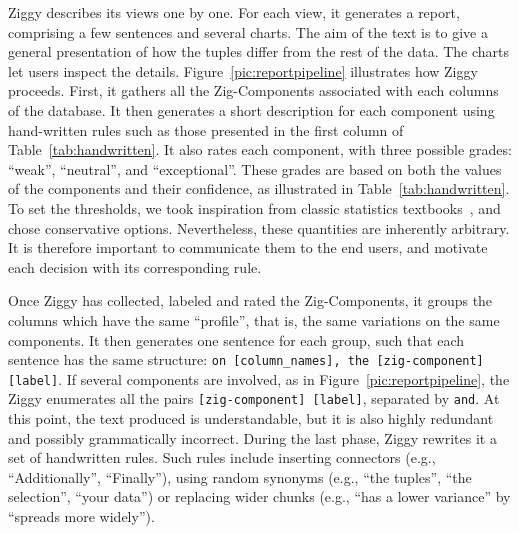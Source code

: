 Ziggy describes its views one by one. For each view, it generates a report,
comprising a few sentences and several charts. The aim of the text is to give a
general presentation of how the tuples differ from the rest of the data. The
charts let users inspect the details.  Figure~\ref{pic:reportpipeline}
illustrates how Ziggy proceeds. First, it gathers all the Zig-Components
associated with each columns of the database. It then ge\-nerates a short
description for each component using hand-written rules such as those
presented in the first column of Table~\ref{tab:handwritten}. It also rates 
each component, with three possible grades: ``weak'', ``neutral'', and
``exceptional''. These grades are based on both the values of the components
and their confidence, as illustrated in Table~\ref{tab:handwritten}.  To set
the thresholds, we took inspiration from classic statistics
textbooks~\cite{cohen1977statistical}, and chose conservative options.
Nevertheless, these quantities are inherently arbitrary. It is therefore
important to communicate them to the end users, and motivate each decision with
its corresponding rule.

Once Ziggy has collected, labeled and rated the Zig-Comp\-onents, it  groups
the columns which have the same ``profile'', that is, the same variations on
the same components. It then generates one sentence for each group, such that
each sentence has the same structure: \texttt{on [column\_names], the
[zig-component] [label]}. If several components are involved, as in
Figure~\ref{pic:reportpipeline}, the Ziggy enumerates all the pairs
\texttt{[zig-component] [label]}, separated by \texttt{and}. At this point, the
text produced is understandable, but it is also highly redundant and possibly
grammatically incorrect. During the last phase, Ziggy rewrites it a set of
handwritten rules. Such rules include inserting connectors (e.g.,
``Additionally'', ``Finally''), using random synonyms (e.g., ``the tuples'',
``the selection'', ``your data'') or replacing wider chunks (e.g., ``has a
lower variance'' by ``spreads more widely'').

